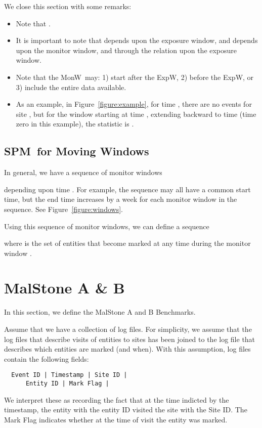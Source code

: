 \documentclass{acm_proc_article-sp}
\def\spm{\mbox{SPM}}
\def\expwindow{\mbox{ExpW}}
\def\monwindow{\mbox{MonW}}
\def\malstone{MalStone } \def\malgen{MalGen }
\begin{document}
We close this section with some remarks:
\begin{itemize}

\item Note that .

\item It is important to note
that  depends upon the exposure window, and  depends upon the
monitor window, and through the relation  upon the exposure window.

\item Note that the \monwindow\ may: 1) start after the \expwindow, 2) before
the \expwindow, or 3) include the entire data available.

\item As an example, in Figure~\ref{figure:example}, 
for time , there are no events for
site , but for the window starting at time , extending backward to
time  (time zero in this example), the statistic is 
.

\end{itemize}



\subsection{\spm\ for Moving Windows}

In general, we have a sequence of monitor windows  

depending upon time .  For example, the sequence may all have a common
start time, but the end time increases by a week for each monitor window
in the sequence.  See Figure~\ref{figure:windows}.

Using this sequence of monitor windows, we can define a sequence

where  is the set of entities  that become marked
at any time during the monitor window .


\section{\malstone A \& B}
\label{section:benchmark}
In this section, we define the MalStone A and B Benchmarks.

Assume that we have a collection of log files.  For simplicity, we assume
that the log files that describe visits of entities to sites has been joined
to the log file that describes which entities are marked (and when).
With this assumption, log files contain the following fields:
\begin{verbatim}
  Event ID | Timestamp | Site ID | 
      Entity ID | Mark Flag |
\end{verbatim}
We interpret these as recording the fact that at the time indicted by the timestamp,
the entity with the entity ID visited the site with the Site ID.  The Mark Flag indicates
whether at the time of visit the entity was marked.  
\end{document}
